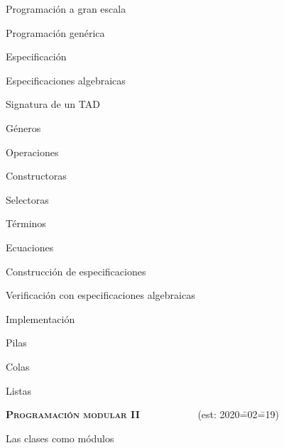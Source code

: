 \begin{longenum}
\begin{longenum}
\begin{longenum}
\begin{longenum}
                \item Programación a gran escala
                \item Programación genérica
            \end{longenum}
        \end{longenum}
        \item Especificación
        \begin{longenum}
            \item Especificaciones algebraicas
            \begin{longenum}
                \item Signatura de un TAD
                \begin{longenum}
                    \item Géneros
                    \item Operaciones
                    \begin{longenum}
                        \item Constructoras
                        \item Selectoras
                    \end{longenum}
                \end{longenum}
                \item Términos
                \item Ecuaciones
            \end{longenum}
            \item Construcción de especificaciones
            \item Verificación con especificaciones algebraicas
        \end{longenum}
        \item Implementación
        \begin{longenum}
            \item Pilas
            \item Colas
            \item Listas
        \end{longenum}
    \end{longenum}
    \item \textbf{\textsc{Programación modular II}} \ \ \ \ \ \ \ \ \ \ \ (est: 2020\==02\==19)
    \begin{longenum}
        \item Las clases como módulos
        \begin{longenum}

\end{longenum}
\end{longenum}
\end{longenum}
